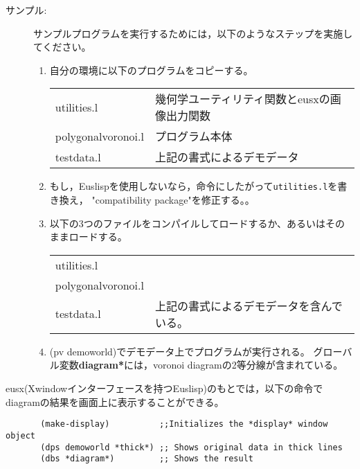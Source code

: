 \begin{description}
\item[サンプル:]
サンプルプログラムを実行するためには，以下のようなステップを実施してください。
\begin{enumerate}
\item 自分の環境に以下のプログラムをコピーする。\\
\begin{tabular}{ll}
utilities.l & 幾何学ユーティリティ関数とeusxの画像出力関数\\
polygonalvoronoi.l & プログラム本体\\
testdata.l & 上記の書式によるデモデータ
\end{tabular}
\item もし，Euslispを使用しないなら，命令にしたがって{\tt utilities.l}を書き換え，
"compatibility package"を修正する。。
\item 以下の3つのファイルをコンパイルしてロードするか、あるいはそのままロードする。\\
\begin{tabular}{ll}
utilities.l\\
polygonalvoronoi.l\\
testdata.l & 上記の書式によるデモデータを含んでいる。
\end{tabular}
\item (pv demoworld)でデモデータ上でプログラムが実行される。
グローバル変数{\bf *diagram*}には，voronoi diagramの2等分線が含まれている。
\end{enumerate}
\end{description}

eusx(Xwindowインターフェースを持つEuslisp)のもとでは，以下の命令でdiagramの結果を画面上に表示することができる。
\begin{verbatim}
       (make-display)          ;;Initializes the *display* window object
       (dps demoworld *thick*) ;; Shows original data in thick lines
       (dbs *diagram*)         ;; Shows the result
\end{verbatim}

\begin{refdesc}
\end{refdesc}

\newpage
